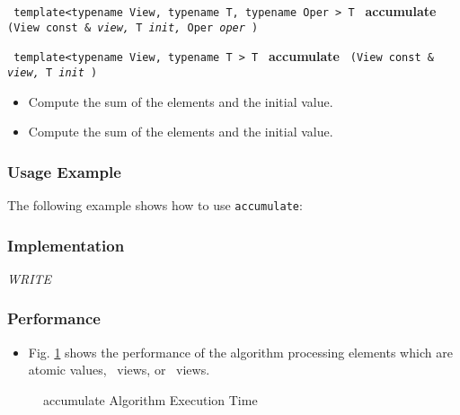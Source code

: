 \noindent
\texttt{%
template<typename View, typename T, typename Oper >
\newline
T 
}
\newline
\textbf{accumulate}%
\texttt{%
(View const \&
\textit{view,}%
T 
\textit{init,}%
Oper 
\textit{oper}%
)
}
\vspace{0.4cm}

\noindent
\texttt{%
template<typename View, typename T >
\newline
T 
}
\newline
\textbf{accumulate}%
\texttt{%
(View const \&
\textit{view,}%
T 
\textit{init}%
)
}

\begin{itemize}
\item
Compute the sum of the elements and the initial value. 
\item
Compute the sum of the elements and the initial value. 
\end{itemize}

\subsubsection{Usage Example} %

The following example shows how to use \texttt{accumulate}:


\subsubsection{Implementation} %

\textit{WRITE}

\subsubsection{Performance} %

\begin{itemize}
\item
Fig. \ref{fig:accum-alg-exec-exper}
shows the performance of the algorithm processing
elements which are atomic values, \stl\ views, or \stapl\ views.
\end{itemize}

\begin{figure}[p]
\caption{accumulate Algorithm Execution Time}
\label{fig:accum-alg-exec-exper}
\end{figure}

